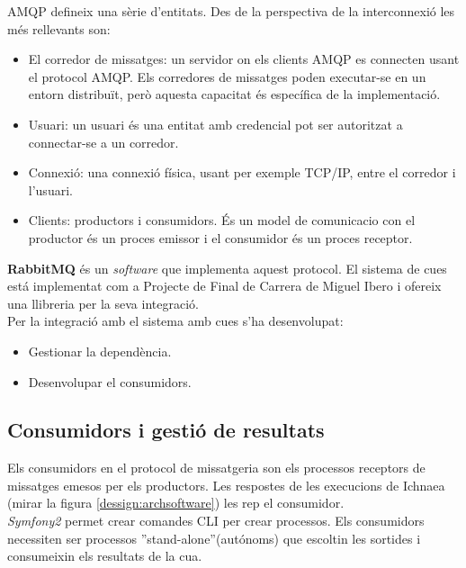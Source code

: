 AMQP defineix una s\`{e}rie d'entitats. Des de la perspectiva de la interconnexió les m\'{e}s rellevants son:
\begin{itemize}
\item El corredor de missatges: un servidor on els clients AMQP es connecten usant el protocol AMQP. Els corredores de missatges poden executar-se en un entorn distribuït, però aquesta capacitat \'{e}s espec\'{i}fica de la implementació.
\item Usuari: un usuari \'{e}s una entitat amb credencial pot ser autoritzat a connectar-se a un corredor.
\item Connexió: una connexi\'{o} f\'{i}sica, usant per exemple TCP/IP, entre el corredor i l'usuari.
\item Clients: productors i consumidors. \'{E}s un model de comunicacio con el productor \'{e}s un proces emissor  i el consumidor \'{e}s un proces receptor.\cite{messaging}
\end{itemize}

\textbf{RabbitMQ} \'{e}s un \textit{software} que implementa aquest protocol. El sistema de cues est\'{a} implementat com a Projecte de Final de Carrera de Miguel Ibero i ofereix una llibreria per la seva integració.\\

Per la integració amb el sistema amb cues s'ha desenvolupat:
\begin{itemize}
\item Gestionar la dependència.
\item Desenvolupar el consumidors.
\end{itemize}

\subsection{Consumidors i gesti\'{o} de resultats}
Els consumidors en el protocol de missatgeria son els processos receptors de missatges emesos per els productors. Les respostes de les execucions de Ichnaea  (mirar la figura \ref{dessign:archsoftware}) les rep el consumidor. \\

\textit{Symfony2} permet crear comandes CLI per crear processos. Els consumidors necessiten ser processos ''stand-alone''(aut\'{o}noms) que escoltin les sortides i consumeixin els resultats de la cua. \\

